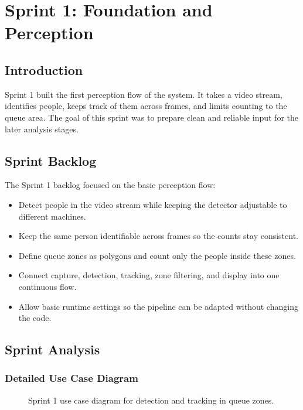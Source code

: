 \chapter{Sprint 1: Foundation and Perception}
\chaptertoc

\clearpage

\section{Introduction}
Sprint 1 built the first perception flow of the system. It takes a video stream, identifies people, keeps track of them across frames, and limits counting to the queue area. The goal of this sprint was to prepare clean and reliable input for the later analysis stages.

\section{Sprint Backlog}
The Sprint 1 backlog focused on the basic perception flow:
\begin{itemize}
    \item Detect people in the video stream while keeping the detector adjustable to different machines.
    \item Keep the same person identifiable across frames so the counts stay consistent.
    \item Define queue zones as polygons and count only the people inside these zones.
    \item Connect capture, detection, tracking, zone filtering, and display into one continuous flow.
    \item Allow basic runtime settings so the pipeline can be adapted without changing the code.
\end{itemize}

\section{Sprint Analysis}

\subsection{Detailed Use Case Diagram}
\begin{figure}[H]
    \centering
    \caption{Sprint 1 use case diagram for detection and tracking in queue zones.}
    \label{fig:sprint1_use_case}
\end{figure}

